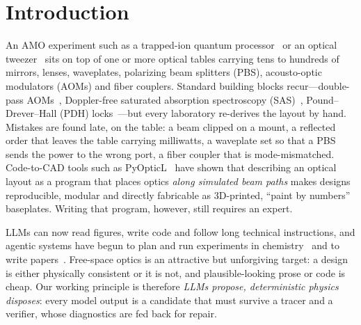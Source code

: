 \documentclass[10pt,twocolumn,letterpaper]{article}
\begin{document}
\section{Introduction}
An AMO experiment such as a trapped-ion quantum processor~\cite{bruzewicz2019} or an optical tweezer~\cite{ashkin1986,gieseler2021} sits on top of one or more optical tables carrying tens to hundreds of mirrors, lenses, waveplates, polarizing beam splitters (PBS), acousto-optic modulators (AOMs) and fiber couplers. Standard building blocks recur---double-pass AOMs~\cite{donley2005}, Doppler-free saturated absorption spectroscopy (SAS)~\cite{preston1996}, Pound--Drever--Hall (PDH) locks~\cite{black2001}---but every laboratory re-derives the layout by hand. Mistakes are found late, on the table: a beam clipped on a mount, a reflected order that leaves the table carrying milliwatts, a waveplate set so that a PBS sends the power to the wrong port, a fiber coupler that is mode-mismatched. Code-to-CAD tools such as PyOpticL~\cite{pyopticl} have shown that describing an optical layout as a program that places optics \emph{along simulated beam paths} makes designs reproducible, modular and directly fabricable as 3D-printed, ``paint by numbers'' baseplates. Writing that program, however, still requires an expert.

LLMs can now read figures, write code and follow long technical instructions, and agentic systems have begun to plan and run experiments in chemistry~\cite{coscientist2023,chemcrow2024} and to write papers~\cite{aiscientist2024}. Free-space optics is an attractive but unforgiving target: a design is either physically consistent or it is not, and plausible-looking prose or code is cheap. Our working principle is therefore \emph{LLMs propose, deterministic physics disposes}: every model output is a candidate that must survive a tracer and a verifier, whose diagnostics are fed back for repair.
\end{document}
